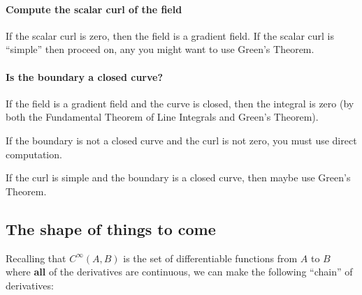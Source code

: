 \documentclass{ximera}
\begin{document}
\paragraph{Compute the scalar curl of the field}
If the scalar curl is zero, then the field is a gradient field.
If the scalar curl is ``simple'' then proceed on, any you might want to use Green's Theorem.


\paragraph{Is the boundary  a closed curve?}
If the field is a gradient field and the curve is closed, then the
integral is zero (by both the Fundamental Theorem of Line Integrals
and Green's Theorem).

If the boundary is not a closed curve and the curl is not zero, you
must use direct computation.

If the curl is simple and the boundary is a closed curve, then maybe
use Green's Theorem.



\subsection{The shape of things to come}

Recalling that $C^\infty(A,B)$ is the set of differentiable functions
from $A$ to $B$ where \textbf{all} of the derivatives are continuous,
we can make the following ``chain'' of derivatives:
\end{document}

